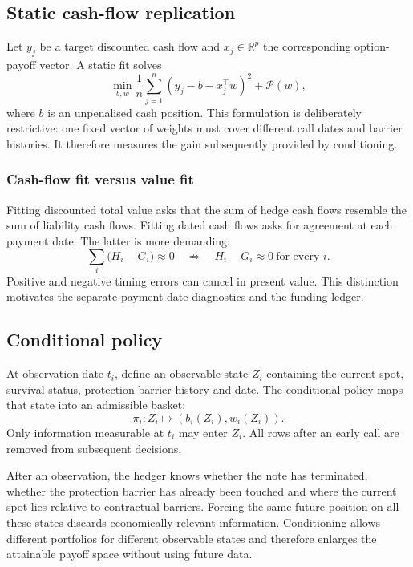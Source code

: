 \documentclass[12pt,a4paper]{article}
\newcommand{\R}{\mathbb{R}}
\newcommand{\1}{\mathbf{1}}
\begin{document}
\subsection{Static cash-flow replication}

Let $y_j$ be a target discounted cash flow and $x_j\in\R^p$ the corresponding option-payoff vector. A static fit solves
\begin{equation}
 \min_{b,w}\frac1n\sum_{j=1}^n(y_j-b-x_j^\top w)^2+\mathcal P(w),
\label{eq:static-objective}
\end{equation}
where $b$ is an unpenalised cash position. This formulation is deliberately
restrictive: one fixed vector of weights must cover different call dates and
barrier histories. It therefore measures the gain subsequently provided by
conditioning.

\subsubsection*{Cash-flow fit versus value fit}

Fitting discounted total value asks that the sum of hedge cash flows resemble
the sum of liability cash flows. Fitting dated cash flows asks for agreement at
each payment date. The latter is more demanding:
\begin{equation}
 \sum_i \bigl(H_i-G_i\bigr)\approx0
 \quad\not\Rightarrow\quad
 H_i-G_i\approx0\ \text{for every }i.
\label{eq:timing-cancellation}
\end{equation}
Positive and negative timing errors can cancel in present value. This
distinction motivates the separate payment-date diagnostics and the funding
ledger.

\subsection{Conditional policy}

At observation date $t_i$, define an observable state $Z_i$ containing the current spot, survival status, protection-barrier history and date. The conditional policy maps that state into an admissible basket:
\begin{equation}
 \pi_i:Z_i\longmapsto (b_i(Z_i),w_i(Z_i)).
\label{eq:conditional-policy}
\end{equation}
Only information measurable at $t_i$ may enter $Z_i$. All rows after an early call are removed from subsequent decisions.

After an observation, the hedger knows whether the note has terminated,
whether the protection barrier has already been touched and where the current
spot lies relative to contractual barriers. Forcing the same future position
on all these states discards economically relevant information. Conditioning
allows different portfolios for different observable states and therefore
enlarges the attainable payoff space without using future data.
\end{document}
